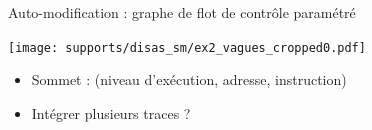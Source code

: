 \documentclass{beamer}
\begin{document}
\begin{frame}{Auto-modification : graphe de flot de contrôle paramétré}
\begin{minipage}{0.45\textwidth}
\begin{center}
 \texttt{[image: supports/disas\_sm/ex2\_vagues\_cropped0.pdf]}
\end{center}
\end{minipage}
\begin{minipage}{0.5\textwidth}

\begin{itemize}
 \item Sommet : (niveau d'exécution, adresse, instruction)
\pause
 \item Intégrer plusieurs traces ?
\end{itemize}
\end{minipage}
\end{frame}
\end{document}
